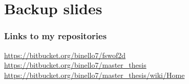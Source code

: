 \documentclass[xcolor=dvipsnames, USenglish]{beamer}  %
\begin{document}




\section{Backup slides}
  \begin{frame}
    \frametitle{Links to my repositories}
    \small{\url{https://bitbucket.org/binello7/fswof2d}}\\
    \small{\url{https://bitbucket.org/binello7/master_thesis}}\\
    \small{\url{https://bitbucket.org/binello7/master_thesis/wiki/Home}}
  \end{frame}

\end{document}
